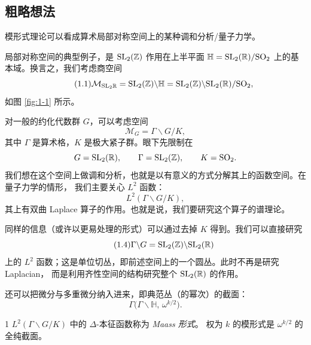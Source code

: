 \subsection{粗略想法}

模形式理论可以看成算术局部对称空间上的某种调和分析/量子力学。

局部对称空间的典型例子，是 $\mathrm{SL}_2(\mathbb{Z})$ 作用在上半平面
$\mathbb{H}=\mathrm{SL}_2(\mathbb{R})/\mathrm{SO}_2$ 上的基本域。换言之，我们考虑商空间
\begin{equation}\tag{1.1}\label{eq:1.1}
\mathcal{M}_{\mathrm{SL}_2\mathbb{R}}
  =\mathrm{SL}_2(\mathbb{Z})\backslash\mathbb{H}
  =\mathrm{SL}_2(\mathbb{Z})\backslash\mathrm{SL}_2(\mathbb{R})/\mathrm{SO}_2 ,
\end{equation}
如图 \ref{fig:1-1} 所示。

对一般的约化代数群 $G$，可以考虑空间
\begin{equation}\tag{1.2}\label{eq:1.2}
\mathcal{M}_G=\Gamma\backslash G/K,
\end{equation}
其中 $\Gamma$ 是算术格，$K$ 是极大紧子群。眼下先限制在
\[
G=\mathrm{SL}_2(\mathbb{R}),\qquad
\Gamma=\mathrm{SL}_2(\mathbb{Z}),\qquad
K=\mathrm{SO}_2 .
\]
我们想在这个空间上做调和分析，也就是以有意义的方式分解其上的函数空间。在量子力学的情形，
我们主要关心 $L^2$ 函数：
\begin{equation}\tag{1.3}\label{eq:1.3}
L^2(\Gamma\backslash G/K),
\end{equation}
其上有双曲 Laplace 算子的作用。也就是说，我们要研究这个算子的谱理论。

同样的信息（或许以更易处理的形式）可以通过去掉 $K$ 得到。我们可以直接研究
\begin{equation}\tag{1.4}\label{eq:1.4}
\Gamma\backslash G=\mathrm{SL}_2(\mathbb{Z})\backslash\mathrm{SL}_2(\mathbb{R})
\end{equation}
上的 $L^2$ 函数；这是单位切丛，即前述空间上的一个圆丛。此时不再是研究 Laplacian，
而是利用齐性空间的结构研究整个 $\mathrm{SL}_2(\mathbb{R})$ 的作用。

还可以把微分与多重微分纳入进来，即典范丛（的幂次）的截面：
\begin{equation}\tag{1.5}\label{eq:1.5}
\Gamma\bigl(\Gamma\backslash\mathbb{H},\,\omega^{k/2}\bigr).
\end{equation}

\begin{srcdef}{1}
$L^2(\Gamma\backslash G/K)$ 中的 $\Delta$-本征函数称为 \emph{Maass 形式}。
权为 $k$ 的模形式是 $\omega^{k/2}$ 的全纯截面。
\end{srcdef}


